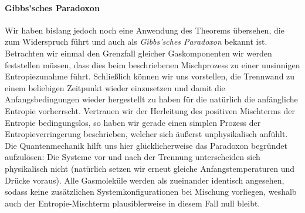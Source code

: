 \paragraph*{Gibbs'sches Paradoxon}
Wir haben bislang jedoch noch eine Anwendung des Theorems übersehen, die zum Widerspruch führt und auch als \emph{Gibbs'sches Paradoxon} bekannt ist.
Betrachten wir einmal den Grenzfall gleicher Gaskomponenten \textendash{} wir werden feststellen müssen, dass dies beim beschriebenen Mischprozess zu einer unsinnigen Entropiezunahme führt. Schließlich können wir uns vorstellen, die Trennwand zu einem beliebigen Zeitpunkt wieder einzusetzen und damit die Anfangsbedingungen wieder hergestellt zu haben \textendash{} für die natürlich die anfängliche Entropie vorherrscht. Vertrauen wir der Herleitung des positiven Mischterms der Entropie bedingungslos, so haben wir gerade einen simplen Prozess der Entropieverringerung beschrieben, welcher sich äußerst unphysikalisch anfühlt. Die Quantenmechanik hilft uns hier glücklicherweise das Paradoxon begründet aufzulösen: Die Systeme vor und nach der Trennung unterscheiden sich physikalisch nicht (natürlich setzen wir erneut gleiche Anfangstemperaturen und Drücke voraus). Alle Gasmoleküle werden als zueinander identisch angesehen, sodass keine zusätzlichen Systemkonfigurationen bei Mischung vorliegen, weshalb auch der Entropie-Mischterm plausiblerweise in diesem Fall null bleibt.

